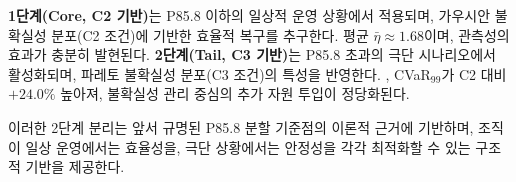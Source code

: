
\textbf{1단계(Core, C2 기반)}는 P85.8 이하의 일상적 운영 상황에서 적용되며,
가우시안 불확실성 분포(C2 조건)에 기반한 효율적 복구를 추구한다.
 평균 $\bar{\eta} \approx 1.68$이며,
 관측성의 효과가 충분히 발현된다.
\textbf{2단계(Tail, C3 기반)}는 P85.8 초과의 극단 시나리오에서 활성화되며,
파레토 불확실성 분포(C3 조건)의 특성을 반영한다.
,
CVaR$_{99}$가 C2 대비 $+24.0\%$ 높아져, 불확실성 관리 중심의 추가 자원
투입이 정당화된다.

이러한 2단계 분리는 앞서 규명된 P85.8 분할 기준점의 이론적 근거에
기반하며, 조직이 일상 운영에서는 효율성을, 극단 상황에서는
안정성을 각각 최적화할 수 있는 구조적 기반을 제공한다.

